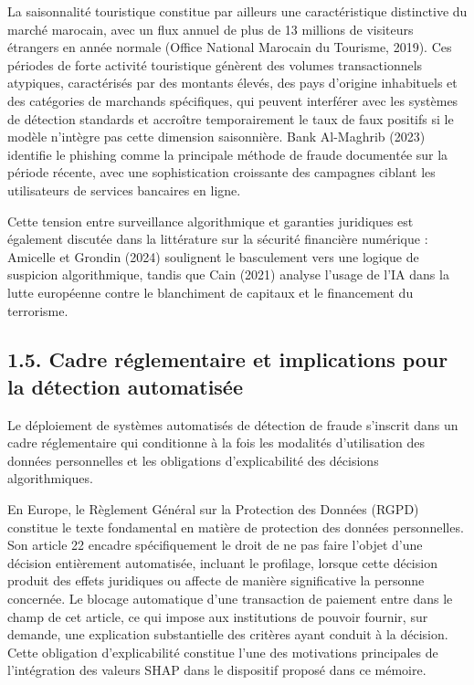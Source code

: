 La saisonnalité touristique constitue par ailleurs une caractéristique distinctive du marché marocain, avec un flux annuel de plus de 13 millions de visiteurs étrangers en année normale (Office National Marocain du Tourisme, 2019). Ces périodes de forte activité touristique génèrent des volumes transactionnels atypiques, caractérisés par des montants élevés, des pays d'origine inhabituels et des catégories de marchands spécifiques, qui peuvent interférer avec les systèmes de détection standards et accroître temporairement le taux de faux positifs si le modèle n'intègre pas cette dimension saisonnière. Bank Al-Maghrib (2023) identifie le phishing comme la principale méthode de fraude documentée sur la période récente, avec une sophistication croissante des campagnes ciblant les utilisateurs de services bancaires en ligne.

Cette tension entre surveillance algorithmique et garanties juridiques est également discutée dans la littérature sur la sécurité financière numérique : Amicelle et Grondin (2024) soulignent le basculement vers une logique de suspicion algorithmique, tandis que Cain (2021) analyse l'usage de l'IA dans la lutte européenne contre le blanchiment de capitaux et le financement du terrorisme.

\subsection{1.5. Cadre réglementaire et implications pour la détection automatisée}

Le déploiement de systèmes automatisés de détection de fraude s'inscrit dans un cadre réglementaire qui conditionne à la fois les modalités d'utilisation des données personnelles et les obligations d'explicabilité des décisions algorithmiques.

En Europe, le Règlement Général sur la Protection des Données (RGPD) constitue le texte fondamental en matière de protection des données personnelles. Son article 22 encadre spécifiquement le droit de ne pas faire l'objet d'une décision entièrement automatisée, incluant le profilage, lorsque cette décision produit des effets juridiques ou affecte de manière significative la personne concernée. Le blocage automatique d'une transaction de paiement entre dans le champ de cet article, ce qui impose aux institutions de pouvoir fournir, sur demande, une explication substantielle des critères ayant conduit à la décision. Cette obligation d'explicabilité constitue l'une des motivations principales de l'intégration des valeurs SHAP dans le dispositif proposé dans ce mémoire.

